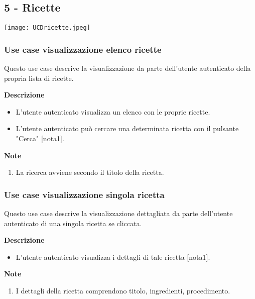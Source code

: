 \documentclass[a4paper,12pt]{article}
\begin{document}
\subsection*{5 - Ricette }

\begin{center}
  \texttt{[image: UCDricette.jpeg]}
\end{center}

\subsubsection*{Use case visualizzazione elenco ricette}

Questo use case descrive la visualizzazione da parte dell'utente autenticato della propria lista di ricette.

\textbf{Descrizione}
\begin{itemize} \setlength\itemsep{0.01em}
\item L'utente autenticato visualizza un elenco con le proprie ricette.
\item L'utente autenticato può cercare una determinata ricetta con il pulsante "Cerca" [nota1].
\end{itemize}

\textbf{Note}
\begin{enumerate} \setlength\itemsep{0.01em}
\item La ricerca avviene secondo il titolo della ricetta.
\end{enumerate}



\subsubsection*{Use case visualizzazione singola ricetta}

Questo use case descrive  la visualizzazione dettagliata da parte dell'utente autenticato di una singola ricetta se cliccata.

\textbf{Descrizione}
\begin{itemize} \setlength\itemsep{0.01em}
\item L'utente autenticato visualizza i dettagli di tale ricetta [nota1].
\end{itemize}

\textbf{Note}
\begin{enumerate} \setlength\itemsep{0.01em}
\item I dettagli della ricetta comprendono titolo, ingredienti, procedimento.
\end{enumerate}
\end{document}
